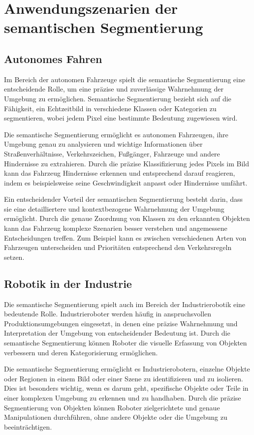 \chapter{Anwendungszenarien der semantischen Segmentierung}
\section{Autonomes Fahren}
Im Bereich der autonomen Fahrzeuge spielt die semantische Segmentierung eine
entscheidende Rolle, um eine präzise und zuverlässige Wahrnehmung der Umgebung
zu ermöglichen. Semantische Segmentierung bezieht sich auf die Fähigkeit, ein
Echtzeitbild in verschiedene Klassen oder Kategorien zu segmentieren, wobei
jedem Pixel eine bestimmte Bedeutung zugewiesen wird.

Die semantische Segmentierung ermöglicht es autonomen Fahrzeugen, ihre Umgebung
genau zu analysieren und wichtige Informationen über Straßenverhältnisse,
Verkehrszeichen, Fußgänger, Fahrzeuge und andere Hindernisse zu extrahieren.
Durch die präzise Klassifizierung jedes Pixels im Bild kann das Fahrzeug
Hindernisse erkennen und entsprechend darauf reagieren, indem es beispielsweise
seine Geschwindigkeit anpasst oder Hindernisse umfährt.

Ein entscheidender Vorteil der semantischen Segmentierung besteht darin, dass
sie eine detailliertere und kontextbezogene Wahrnehmung der Umgebung
ermöglicht. Durch die genaue Zuordnung von Klassen zu den erkannten Objekten
kann das Fahrzeug komplexe Szenarien besser verstehen und angemessene
Entscheidungen treffen. Zum Beispiel kann es zwischen verschiedenen Arten von
Fahrzeugen unterscheiden und Prioritäten entsprechend den Verkehrsregeln
setzen.
\section{Robotik in der Industrie}

Die semantische Segmentierung spielt auch im Bereich der Industrierobotik eine
bedeutende Rolle. Industrieroboter werden häufig in anspruchsvollen
Produktionsumgebungen eingesetzt, in denen eine präzise Wahrnehmung und
Interpretation der Umgebung von entscheidender Bedeutung ist. Durch die
semantische Segmentierung können Roboter die visuelle Erfassung von Objekten
verbessern und deren Kategorisierung ermöglichen.

Die semantische Segmentierung ermöglicht es Industrierobotern, einzelne Objekte
oder Regionen in einem Bild oder einer Szene zu identifizieren und zu
isolieren. Dies ist besonders wichtig, wenn es darum geht, spezifische Objekte
oder Teile in einer komplexen Umgebung zu erkennen und zu handhaben. Durch die
präzise Segmentierung von Objekten können Roboter zielgerichtete und genaue
Manipulationen durchführen, ohne andere Objekte oder die Umgebung zu
beeinträchtigen.


